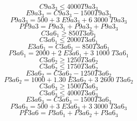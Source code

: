 \begin{equation}
C9a3_{3} \leq 4000 T9a3_{3}
\end{equation}
\begin{equation}
E9a3_{3} = C9a3_{3} - 1500 T9a3_{3}
\end{equation}
\begin{equation}
P9a3_{3} = 500 + 3 \; E9a3_{3} + 6 \; 3000 \; T9a3_{3}
\end{equation}
\begin{equation}
PF9a3 = P9a3_{1} + P9a3_{2} + P9a3_{3}
\end{equation}
\begin{equation}
C3a6_{1} \geq 850 T3a6_{1}
\end{equation}
\begin{equation}
C3a6_{1} \leq 2000 T3a6_{1}
\end{equation}
\begin{equation}
E3a6_{1} = C3a6_{1} - 850 T3a6_{1}
\end{equation}
\begin{equation}
P3a6_{1} = 2000 + 2 \; E3a6_{1} + 3 \; 1000 \; T3a6_{1}
\end{equation}
\begin{equation}
C3a6_{2} \geq 1250 T3a6_{2}
\end{equation}
\begin{equation}
C3a6_{2} \leq 1750 T3a6_{2}
\end{equation}
\begin{equation}
E3a6_{2} = C3a6_{2} - 1250 T3a6_{2}
\end{equation}
\begin{equation}
P3a6_{2} = 1000 + 1.30 \; E3a6_{2} + 3 \; 2600 \; T3a6_{2}
\end{equation}
\begin{equation}
C3a6_{3} \geq 1500 T3a6_{3}
\end{equation}
\begin{equation}
C3a6_{3} \leq 4000 T3a6_{3}
\end{equation}
\begin{equation}
E3a6_{3} = C3a6_{3} - 1500 T3a6_{3}
\end{equation}
\begin{equation}
P3a6_{3} = 500 + 3 \; E3a6_{3} + 3 \; 3000 \; T3a6_{3}
\end{equation}
\begin{equation}
PF3a6 = P3a6_{1} + P3a6_{2} + P3a6_{3}
\end{equation}
